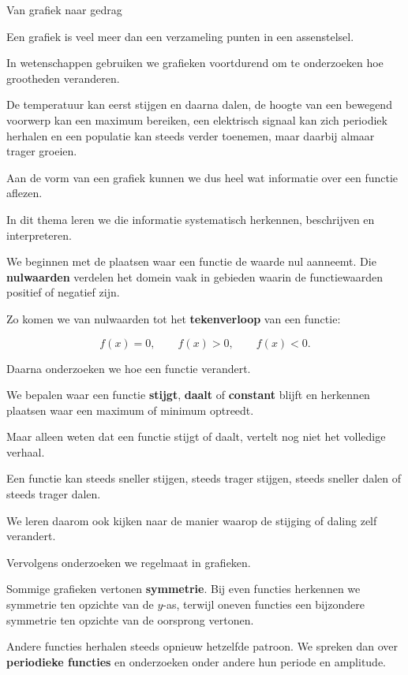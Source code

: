 \documentclass{xourse}
\begin{document}
\begin{themaintro}{Van grafiek naar gedrag}

  Een grafiek is veel meer dan een verzameling punten
  in een assenstelsel.

  In wetenschappen gebruiken we grafieken voortdurend
  om te onderzoeken hoe grootheden veranderen.

  De temperatuur kan eerst stijgen en daarna dalen,
  de hoogte van een bewegend voorwerp kan een maximum bereiken,
  een elektrisch signaal kan zich periodiek herhalen
  en een populatie kan steeds verder toenemen,
  maar daarbij almaar trager groeien.

  Aan de vorm van een grafiek kunnen we dus heel wat informatie
  over een functie aflezen.

  In dit thema leren we die informatie
  systematisch herkennen, beschrijven en interpreteren.

  We beginnen met de plaatsen waar een functie de waarde nul aanneemt.
  Die \textbf{nulwaarden} verdelen het domein vaak in gebieden
  waarin de functiewaarden positief of negatief zijn.

  Zo komen we van nulwaarden tot het \textbf{tekenverloop}
  van een functie:

  \[
    f(x)=0,
    \qquad
    f(x)>0,
    \qquad
    f(x)<0.
  \]

  Daarna onderzoeken we hoe een functie verandert.

  We bepalen waar een functie \textbf{stijgt},
  \textbf{daalt} of \textbf{constant} blijft
  en herkennen plaatsen waar een maximum of minimum optreedt.

  Maar alleen weten dat een functie stijgt of daalt,
  vertelt nog niet het volledige verhaal.

  Een functie kan steeds sneller stijgen,
  steeds trager stijgen,
  steeds sneller dalen
  of steeds trager dalen.

  We leren daarom ook kijken naar de manier
  waarop de stijging of daling zelf verandert.

  Vervolgens onderzoeken we regelmaat in grafieken.

  Sommige grafieken vertonen \textbf{symmetrie}.
  Bij even functies herkennen we symmetrie ten opzichte van de \(y\)-as,
  terwijl oneven functies een bijzondere symmetrie
  ten opzichte van de oorsprong vertonen.

  Andere functies herhalen steeds opnieuw hetzelfde patroon.
  We spreken dan over \textbf{periodieke functies}
  en onderzoeken onder andere hun periode en amplitude.


\end{themaintro}
\end{document}
